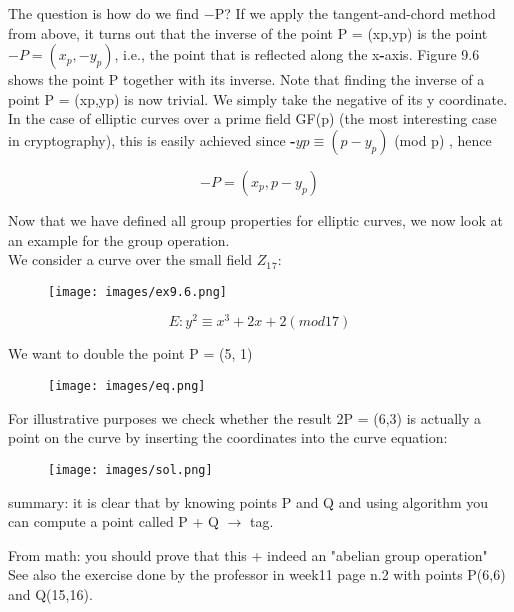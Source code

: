 \documentclass{article}
\begin{document}
The question is how do we find −P? If we apply the tangent-and-chord method
from above, it turns out that the inverse of the point P = (xp,yp) is the point  ${-P =
(x_p, −y_p)}$, i.e., the point that is reflected along the x\textbf{-}axis. Figure 9.6 shows the point
P together with its inverse. Note that finding the inverse of a point P = (xp,yp) is
now trivial. We simply take the negative of its y coordinate. In the case of elliptic
curves over a prime field GF(p) (the most interesting case in cryptography), this is
easily achieved since \textbf{-}${yp \equiv (p - y_p)}$ (mod p)  , hence
    
$${ - P = (x_p, p - y_p)}$$

Now that we have defined all group properties for elliptic curves, we now look at
an example for the group operation. \\
We consider a curve over the small field ${Z_1{_7}}$:

\begin{figure}[H]
	\begin{center}
  		\texttt{[image: images/ex9.6.png]}
 	\end{center}
\end{figure}

$${E : y^2 \equiv x^3 + 2x + 2 ( mod 17 )}$$  

We want to double the point P = (5, 1) 

\begin{figure}[h]
	\begin{center}
  		\texttt{[image: images/eq.png]}
 	\end{center}
\end{figure}

For illustrative purposes we check whether the result 2P = (6,3) is actually a point
on the curve by inserting the coordinates into the curve equation:

\begin{figure}[h]
	\begin{center}
  		\texttt{[image: images/sol.png]}
 	\end{center}
\end{figure}

summary: it is clear that by knowing points P and Q and using algorithm you can compute a point called P + Q $\rightarrow$ tag. 

From math: you should prove that this + indeed an "abelian group operation"\\

See also the exercise done by the professor in week11 page n.2 with points P(6,6) and Q(15,16).
\end{document}
